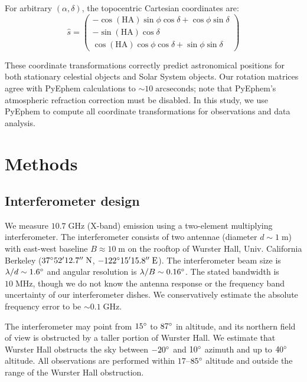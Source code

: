 \documentclass[10pt]{article}
\newcommand {\mt}{\mathrm}
\newcommand {\unit}[1]{\; \mt{#1}}
\begin{document}
For arbitrary $(\alpha, \delta)$, the topocentric Cartesian coordinates are:
\begin{equation}
	\hat{s} =
	\begin{pmatrix}
		-\cos(\mathrm{HA}) \sin\phi \cos\delta + \cos\phi \sin\delta \\
		-\sin(\mathrm{HA}) \cos\delta \\
		 \cos(\mathrm{HA}) \cos\phi \cos\delta + \sin\phi \sin\delta
	\end{pmatrix}
\end{equation}

These coordinate transformations correctly predict astronomical positions for both stationary celestial objects and Solar System objects.
Our rotation matrices agree with PyEphem calculations to $\sim 10 \unit{arcseconds}$; note that PyEphem's atmospheric refraction correction must be disabled.
In this study, we use PyEphem to compute all coordinate transformations for observations and data analysis.


\section{Methods}

\subsection{Interferometer design}

We measure $10.7 \unit{GHz}$ (X-band) emission using a two-element multiplying interferometer.
The interferometer consists of two antennae (diameter $d \sim 1 \unit{m}$) with east-west baseline $B \approx 10 \unit{m}$ on the rooftop of Wurster Hall, Univ. California Berkeley ($37\degree 52' 12.7'' \unit{N}$, $-122\degree 15' 15.8'' \unit{E}$).
The interferometer beam size is $\lambda/d \sim 1.6\degree$ and angular resolution is $\lambda / B \sim 0.16\degree$.
The stated bandwidth is $10 \unit{MHz}$, though we do not know the antenna response or the frequency band uncertainty of our interferometer dishes.
We conservatively estimate the absolute frequency error to be $\sim 0.1 \unit{GHz}$.

The interferometer may point from $15\degree$ to $87\degree$ in altitude, and its northern field of view is obstructed by a taller portion of Wurster Hall.
We estimate that Wurster Hall obstructs the sky between $-20\degree$ and $10\degree$ azimuth and up to $40\degree$ altitude.
All observations are performed within $17$--$85\degree$ altitude and outside the range of the Wurster Hall obstruction.
\end{document}
